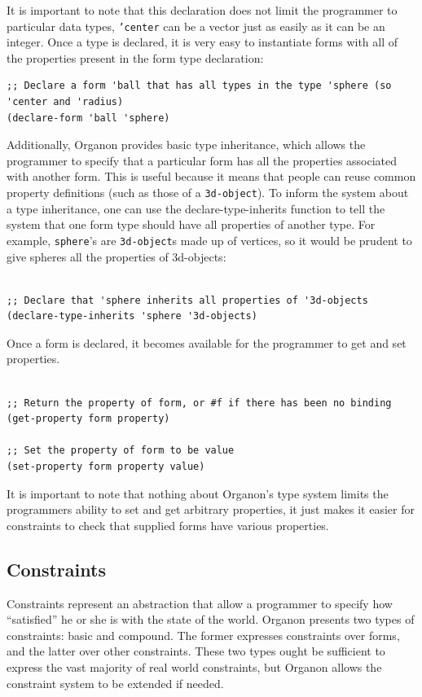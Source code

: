 \documentclass[12pt,a4paper]{article}
\begin{document}
It is important to note that this declaration does not limit the programmer to particular data types, \texttt{'center} can be a vector just as easily as it can be an integer.  Once a type is declared, it is very easy to instantiate forms with all of the properties present in the form type declaration:
\begin{lstlisting}
;; Declare a form 'ball that has all types in the type 'sphere (so 'center and 'radius)
(declare-form 'ball 'sphere) 
\end{lstlisting}

Additionally, Organon provides basic type inheritance, which allows the programmer to specify that a particular form has all the properties associated with another form.   This is useful because it means that people can reuse common property definitions (such as those of a \texttt{3d-object}).  To inform the system about a type inheritance, one can use the declare-type-inherits function to tell the system that one form type should have all properties of another type.  For example, \texttt{sphere}'s are \texttt{3d-object}s made up of vertices, so it would be prudent to give spheres all the properties of 3d-objects:
\begin{lstlisting}

;; Declare that 'sphere inherits all properties of '3d-objects
(declare-type-inherits 'sphere '3d-objects)
\end{lstlisting}

Once a form is declared, it becomes available for the programmer to get and set properties.
\begin{lstlisting}

;; Return the property of form, or #f if there has been no binding
(get-property form property)

;; Set the property of form to be value 
(set-property form property value)
\end{lstlisting}

It is important to note that nothing about Organon's type system limits the programmers ability to set and get arbitrary properties, it just makes it easier for constraints to check that supplied forms have various properties. 

\subsection{Constraints}
Constraints represent an abstraction that allow a programmer to specify how ``satisfied'' he or she is with the state of the world.  Organon presents two types of constraints: basic and compound.  The former expresses constraints over forms, and the latter over other constraints.  These two types ought be sufficient to express the vast majority of real world constraints, but Organon allows the constraint system to be extended if needed.
\end{document}
